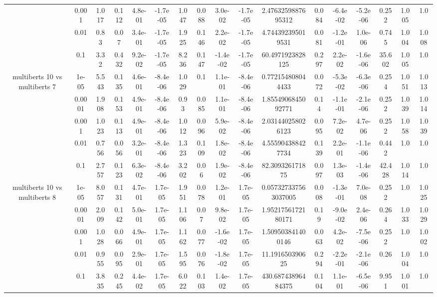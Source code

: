 \begin{tabular}{|c|c|c|c|c|c|c|c|c|c|c|c|c|c|c|c|c|}
 & 0.001 & 1.017 & 0.112 & 4.8e-01 & -1.7e-05 & 1.047 & 0.088 & 3.0e-02 & -1.7e-05 & 2.4763259887695312 & 0.084 & -6.4e-02 & -5.2e-06 & 0.252 & 1.005 & 1.0 \\
 & 0.01 & 0.83 & 0.07 & 3.4e-01 & -1.7e-05 & 1.925 & 0.146 & 2.2e-02 & -1.7e-05 & 4.744392395019531 & 0.081 & -1.2e-01 & 1.0e-06 & 0.745 & 1.004 & 1.008 \\
 & 0.1 & 3.32 & 0.432 & 9.2e-02 & -1.7e-05 & 8.236 & 0.147 & -1.4e-02 & -1.7e-05 & 60.4971923828125 & 0.297 & 2.2e-02 & -1.6e-06 & 35.602 & 1.005 & 1.0 \\
\hline
\multirow{5}{*}{multiberts 10 vs multiberts 7} & 1e-05 & 5.543 & 0.135 & 4.6e-01 & -8.4e-06 & 1.029 & 0.1 & 1.1e-01 & -8.4e-06 & 0.772154808044433 & 0.072 & -5.3e-02 & -6.3e-06 & 0.254 & 1.051 & 1.013 \\
 & 0.0001 & 1.908 & 0.153 & 4.9e-01 & -8.4e-06 & 0.93 & 0.085 & 1.1e-01 & -8.4e-06 & 1.8554906845092771 & 0.14 & -1.1e-01 & -2.1e-06 & 0.252 & 1.039 & 1.014 \\
 & 0.001 & 1.023 & 0.113 & 4.9e-01 & -8.4e-06 & 1.012 & 0.096 & 5.9e-02 & -8.4e-06 & 2.031440258026123 & 0.095 & 7.2e-02 & 4.7e-06 & 0.252 & 1.058 & 1.039 \\
 & 0.01 & 0.756 & 0.056 & 3.2e-01 & -8.4e-06 & 1.323 & 0.109 & 1.8e-02 & -8.4e-06 & 4.555904388427734 & 0.139 & 2.2e-01 & -1.1e-06 & 0.442 & 1.0 & 1.0 \\
 & 0.1 & 2.757 & 0.123 & 6.3e-02 & -8.4e-06 & 3.202 & 0.06 & 1.9e-02 & -8.4e-06 & 82.309326171875 & 0.097 & 1.3e-03 & -1.4e-06 & 42.428 & 1.014 & 1.0 \\
\hline
\multirow{5}{*}{multiberts 10 vs multiberts 8} & 1e-05 & 8.057 & 0.131 & 4.7e-01 & 1.7e-05 & 1.951 & 0.078 & 1.2e-01 & 1.7e-05 & 0.057327337563037005 & 0.008 & -1.3e-01 & 7.0e-08 & 0.252 & 1.0 & 1.025 \\
 & 0.0001 & 2.009 & 0.142 & 5.0e-01 & 1.7e-05 & 1.106 & 0.07 & 9.8e-02 & 1.7e-05 & 1.9521756172180171 & 0.19 & -9.0e-02 & 2.4e-06 & 0.264 & 1.033 & 1.029 \\
 & 0.001 & 1.028 & 0.066 & 4.9e-01 & 1.7e-05 & 1.162 & 0.077 & -1.6e-02 & 1.7e-05 & 1.509503841400146 & 0.063 & 4.2e-02 & -7.5e-06 & 0.252 & 1.0 & 1.002 \\
 & 0.01 & 0.955 & 0.095 & 2.9e-01 & 1.7e-05 & 1.595 & 0.076 & -1.8e-02 & 1.7e-05 & 11.191650390625 & 0.294 & -2.2e-01 & -2.1e-06 & 0.26 & 1.004 & 1.0 \\
 & 0.1 & 3.835 & 0.245 & 4.4e-02 & 1.7e-05 & 6.022 & 0.103 & 1.4e-02 & 1.7e-05 & 430.68743896484375 & 0.104 & 1.1e-01 & -6.5e-06 & 9.951 & 1.001 & 1.0 \\

\end{tabular}
